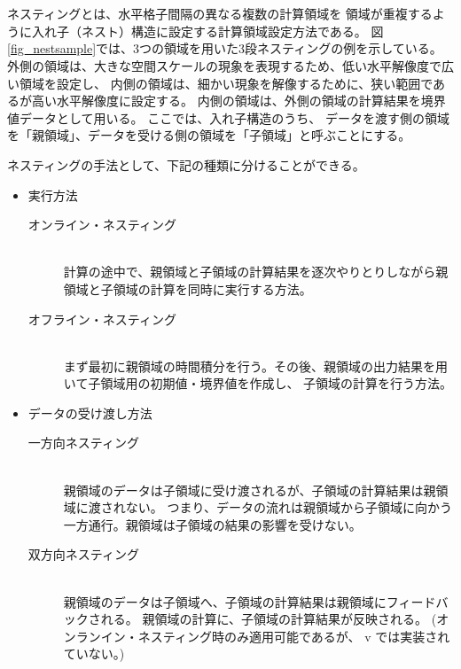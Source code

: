 \section{\SecAdvanceNesting} \label{sec:nest_exp}

ネスティングとは、水平格子間隔の異なる複数の計算領域を
領域が重複するように入れ子（ネスト）構造に設定する計算領域設定方法である。
図\ref{fig_nestsample}では、3つの領域を用いた3段ネスティングの例を示している。
外側の領域は、大きな空間スケールの現象を表現するため、低い水平解像度で広い領域を設定し、
内側の領域は、細かい現象を解像するために、狭い範囲であるが高い水平解像度に設定する。
内側の領域は、外側の領域の計算結果を境界値データとして用いる。
ここでは、入れ子構造のうち、
データを渡す側の領域を「親領域」、データを受ける側の領域を「子領域」と呼ぶことにする。

ネスティングの手法として、下記の種類に分けることができる。
\begin{itemize}
\item 実行方法
\begin{description}
 \item[オンライン・ネスティング]\mbox{}\\
計算の途中で、親領域と子領域の計算結果を逐次やりとりしながら親領域と子領域の計算を同時に実行する方法。
 \item[オフライン・ネスティング]\mbox{}\\
まず最初に親領域の時間積分を行う。その後、親領域の出力結果を用いて子領域用の初期値・境界値を作成し、
子領域の計算を行う方法。
\end{description}
\item データの受け渡し方法
\begin{description}
 \item[一方向ネスティング]\mbox{}\\
親領域のデータは子領域に受け渡されるが、子領域の計算結果は親領域に渡されない。
つまり、データの流れは親領域から子領域に向かう一方通行。親領域は子領域の結果の影響を受けない。
 \item[双方向ネスティング]\mbox{}\\
親領域のデータは子領域へ、子領域の計算結果は親領域にフィードバックされる。
親領域の計算に、子領域の計算結果が反映される。
(オンランイン・ネスティング時のみ適用可能であるが、{\scalerm} v{\version} では実装されていない。)
\end{description}
\end{itemize}

